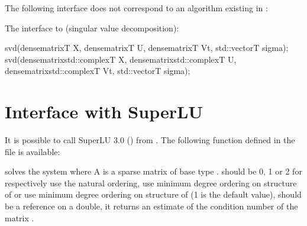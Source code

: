 \documentclass[a4paper,11pt,english]{sphinxmanual}
\begin{document}
\sphinxAtStartPar
The following interface does not correspond to an algorithm existing in :

\sphinxAtStartPar
The interface to  (singular value decomposition):

\begin{sphinxVerbatim}[commandchars=\\\{\}]
svd(dense\PYGZus{}matrix\PYGZlt{}T\PYGZgt{} \PYGZam{}X, dense\PYGZus{}matrix\PYGZlt{}T\PYGZgt{} \PYGZam{}U,
    dense\PYGZus{}matrix\PYGZlt{}T\PYGZgt{} \PYGZam{}Vt, std::vector\PYGZlt{}T\PYGZgt{} sigma);
svd(dense\PYGZus{}matrix\PYGZlt{}std::complex\PYGZlt{}T\PYGZgt{} \PYGZgt{} \PYGZam{}X, dense\PYGZus{}matrix\PYGZlt{}std::complex\PYGZlt{}T\PYGZgt{} \PYGZgt{} \PYGZam{}U,
    dense\PYGZus{}matrix\PYGZlt{}std::complex\PYGZlt{}T\PYGZgt{} \PYGZgt{} \PYGZam{}Vt, std::vector\PYGZlt{}T\PYGZgt{} sigma);
\end{sphinxVerbatim}


\chapter{Interface with SuperLU}
\label{\detokenize{gmm/superlu:interface-with-superlu}}\label{\detokenize{gmm/superlu:gmm-superlu}}\label{\detokenize{gmm/superlu::doc}}
\sphinxAtStartPar
It is possible to call SuperLU 3.0 () from . The following function defined in the file  is available:

\begin{sphinxVerbatim}[commandchars=\\\{\}]
      
\end{sphinxVerbatim}

\sphinxAtStartPar
solves the system  where A is a sparse matrix of base type .  should be 0, 1 or 2 for respectively use the natural ordering, use minimum degree ordering on structure of  or use minimum degree ordering on structure of  (1 is the default value),  should be a reference on a double, it returns an estimate of the condition number of the matrix .
\end{document}
